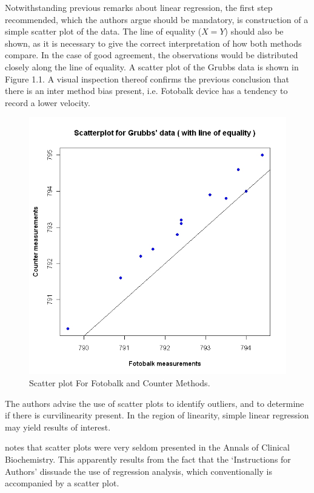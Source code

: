 \documentclass[Main.tex]{subfiles}
\begin{document}
Notwithstanding previous remarks about linear regression, the first step recommended, which the authors argue should be mandatory, is construction of a simple scatter plot of the data. The line of equality ($X=Y$) should also be shown, as it is necessary to give the correct interpretation of how both methods compare. In the case of good agreement, the observations would be distributed closely along the line of equality. A scatter plot of the Grubbs data is shown in Figure 1.1. A visual inspection thereof confirms the previous conclusion that there is an inter method bias present, i.e. Fotobalk device has a tendency to record a lower velocity.

\begin{figure}[h!]
	\begin{center}
		\includegraphics[width=130mm]{images/GrubbsScatter.jpeg}
		\caption{Scatter plot For Fotobalk and Counter Methods.}\label{GrubbsScatter}
	\end{center}
\end{figure}

The authors advise the use of scatter plots to identify outliers, and to determine if there is curvilinearity present. In the region of linearity, simple linear regression may yield results of interest.

\citet{Dewitte} notes that scatter plots were very seldom presented in the Annals of Clinical Biochemistry. This apparently results from the fact that the `Instructions for Authors' dissuade the use of regression analysis, which conventionally is accompanied by a scatter plot.
\end{document}
